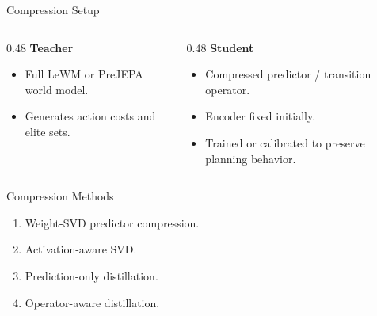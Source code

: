\documentclass[aspectratio=169,11pt]{beamer}
\begin{document}
\begin{frame}{Compression Setup}

    \begin{columns}[T,totalwidth=\textwidth]
        \begin{column}{0.48\textwidth}
            \textbf{Teacher}
            \begin{itemize}
                \item Full LeWM or PreJEPA world model.
                \item Generates action costs and elite sets.
            \end{itemize}
        \end{column}

        \begin{column}{0.48\textwidth}
            \textbf{Student}
            \begin{itemize}
                \item Compressed predictor / transition operator.
                \item Encoder fixed initially.
                \item Trained or calibrated to preserve planning behavior.
            \end{itemize}
        \end{column}
    \end{columns}

\end{frame}

\begin{frame}{Compression Methods}

    \begin{enumerate}
        \item Weight-SVD predictor compression.
        \item Activation-aware SVD.
        \item Prediction-only distillation.
        \item Operator-aware distillation.
    \end{enumerate}

    \vspace{1em}

\end{frame}
\end{document}
